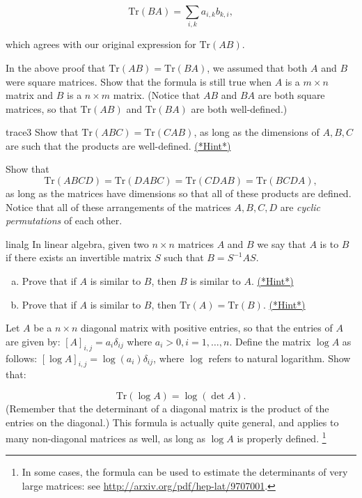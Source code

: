 \[ \text{Tr} \left({B} {A}\right) =\sum_{i,k} a_{i,k}b_{k,i}, \]

which agrees with our original expression for  $\text{Tr} ({A}{B})$.

\begin{exercise}{}
In the above proof that $\text{Tr} ({AB}) = \text{Tr}({BA})$, we assumed that both $A$ and $B$ were square matrices. Show that the formula is still true when $A$ is a $m \times n$ matrix and $B$ is a $n \times m$ matrix.  (Notice that $AB$ and $BA$ are both square matrices, so that $\text{Tr} \left({A} {B}\right)$ and $\text{Tr} \left({B} {A}\right)$ are both well-defined.)
\end{exercise}

\begin{exercise}{trace3}
Show that $\text{Tr} ({ABC}) = \text{Tr}({CAB})$, as long as the dimensions of $A, B, C$ are such that the products are well-defined.
\hyperref[sec:sigma:hints]{(*Hint*)} 
\end{exercise}


\begin{exercise}{}
Show that 
\[ \text{Tr} ({ABCD}) = \text{Tr}({DABC})= \text{Tr}({CDAB}) = \text{Tr}({BCDA}),\] 
as long as the matrices have dimensions so that all of these products are defined.  Notice that all of these arrangements of the matrices $A, B, C, D$ are \emph{cyclic permutations} of each other.
\end{exercise}

\begin{exercise}{linalg}
In linear algebra, given two $n \times n$ matrices $A$ and $B$ we say that $A$ is  to $B$ if there exists an invertible matrix $S$ such that $B = S^{-1}AS$. 
\begin{enumerate}[(a)]
\item
Prove that if $A$ is similar to $B$, then $B$ is similar to $A$.
\hyperref[sec:sigma:hints]{(*Hint*)} 
\item
Prove that if $A$ is similar to $B$, then $\text{Tr} ({A}) = \text{Tr} ({B})$. 
\hyperref[sec:sigma:hints]{(*Hint*)} 
\end{enumerate}
\end{exercise}

\begin{exercise}{}
Let $A$ be a $n \times n$ diagonal matrix with positive entries, so that the entries of $A$ are given by:  $ [A]_{i,j} = a_{i} \delta_{ij}$ where $a_i > 0, i = 1, \ldots, n$.  Define the matrix $\log A$ as follows:  $ [\log A]_{i,j} = \log(a_{i}) \delta_{ij}$, where $\log$ refers to natural logarithm.  Show that:

\[ \text{Tr}(\log A) = \log (\det A). \]
(Remember that the determinant of a diagonal matrix is the product of the entries on the diagonal.)
This formula is actually quite general, and applies to many non-diagonal matrices as well, as long as $\log A$ is properly defined. \footnote{In some cases, the formula can be used to estimate the determinants of very large matrices: see \url{http://arxiv.org/pdf/hep-lat/9707001}.} 
\end{exercise}

